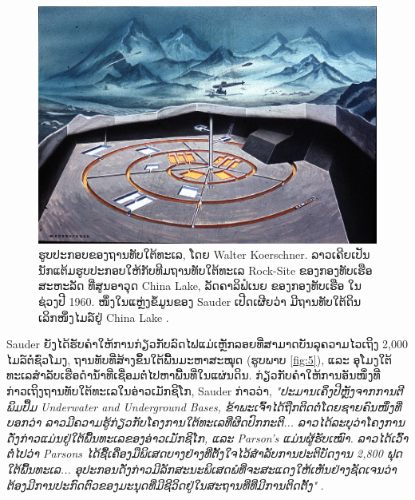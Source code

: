 \documentclass[10pt,twocolumn,letterpaper]{article}
\begin{document}
\begin{figure}[t]
\begin{center}
   \includegraphics[width=1\linewidth]{undersea.jpg}
\end{center}
   \caption{ຮູບປະກອບຂອງຖານທັບໃຕ້ທະເລ, ໂດຍ Walter Koerschner.
ລາວເຄີຍເປັນນັກແຕ້ມຮູບປະກອບໃຫ້ກັບທີມຖານທັບໃຕ້ທະເລ Rock-Site ຂອງກອງທັບເຮືອສະຫະລັດ ທີ່ສູນອາວຸດ China Lake, ລັດຄາລິຟໍເນຍ ຂອງກອງທັບເຮືອ ໃນຊ່ວງປີ 1960. ໜຶ່ງໃນແຫຼ່ງຂໍ້ມູນຂອງ Sauder ເປີດເຜີຍວ່າ ມີຖານທັບໃຕ້ດິນເລິກໜຶ່ງໄມລ໌ຢູ່ China Lake \cite{22,23}.}
\label{fig:5}
\label{fig:onecol}
\end{figure}

Sauder ຍັງໄດ້ຮັບຄໍາໃຫ້ການກ່ຽວກັບລົດໄຟແມ່ເຫຼັກລອຍທີ່ສາມາດບັນລຸຄວາມໄວເຖິງ 2,000 ໄມລ໌ຕໍ່ຊົ່ວໂມງ, ຖານທັບທີ່ສ້າງຂຶ້ນໃຕ້ພື້ນມະຫາສະໝຸດ (ຮູບພາບ \ref{fig:5}), ແລະ ອຸໂມງໃຕ້ທະເລສຳລັບເຮືອດຳນ້ຳທີ່ເຊື່ອມຕໍ່ໄປຫາພື້ນທີ່ໃນແຜ່ນດິນ.
ກ່ຽວກັບຄຳໃຫ້ການອັນໜຶ່ງທີ່ກ່າວເຖິງຖານທັບໃຕ້ທະເລໃນອ່າວເມັກຊິໂກ, Sauder ກ່າວວ່າ, \textit{"ປະມານເຄິ່ງປີຫຼັງຈາກການຕີພິມປຶ້ມ Underwater and Underground Bases, ຂ້າພະເຈົ້າໄດ້ຖືກຕິດຕໍ່ໂດຍຊາຍຄົນໜຶ່ງທີ່ບອກວ່າ ລາວມີຄວາມຮູ້ກ່ຽວກັບໂຄງການໃຕ້ທະເລທີ່ຜິດປົກກະຕິ... ລາວໄດ້ລະບຸວ່າໂຄງການດັ່ງກ່າວແມ່ນຢູ່ໃຕ້ພື້ນທະເລຂອງອ່າວເມັກຊິໂກ, ແລະ Parson's ແມ່ນຜູ້ຮັບເໝົາ. ລາວໄດ້ເວົ້າຕໍ່ໄປວ່າ Parsons ໄດ້ຊື້ເຄື່ອງມືພິເສດບາງຢ່າງທີ່ຕັ້ງໃຈໄວ້ສໍາລັບການປະຕິບັດງານ 2,800 ຟຸດໃຕ້ພື້ນທະເລ... ອຸປະກອນດັ່ງກ່າວມີລັກສະນະພິເສດພໍທີ່ຈະສະແດງໃຫ້ເຫັນຢ່າງຊັດເຈນວ່າ ຕ້ອງມີການປະກົດຕົວຂອງມະນຸດທີ່ມີຊີວິດຢູ່ໃນສະຖານທີ່ທີ່ມີການຕິດຕັ້ງ"} \cite{22}.
\end{document}
